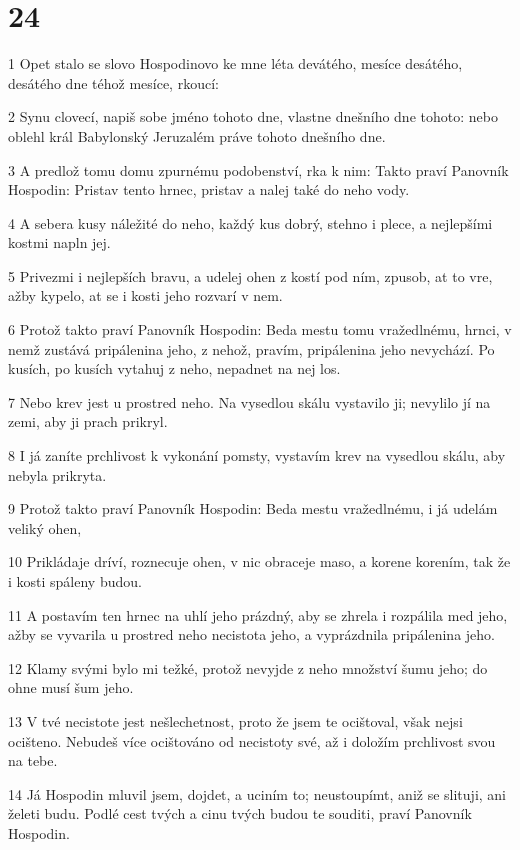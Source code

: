 \chapter{24}

\par 1 Opet stalo se slovo Hospodinovo ke mne léta devátého, mesíce desátého, desátého dne téhož mesíce, rkoucí:
\par 2 Synu clovecí, napiš sobe jméno tohoto dne, vlastne dnešního dne tohoto: nebo oblehl král Babylonský Jeruzalém práve tohoto dnešního dne.
\par 3 A predlož tomu domu zpurnému podobenství, rka k nim: Takto praví Panovník Hospodin: Pristav tento hrnec, pristav a nalej také do neho vody.
\par 4 A sebera kusy náležité do neho, každý kus dobrý, stehno i plece, a nejlepšími kostmi napln jej.
\par 5 Privezmi i nejlepších bravu, a udelej ohen z kostí pod ním, zpusob, at to vre, ažby kypelo, at se i kosti jeho rozvarí v nem.
\par 6 Protož takto praví Panovník Hospodin: Beda mestu tomu vražedlnému, hrnci, v nemž zustává pripálenina jeho, z nehož, pravím, pripálenina jeho nevychází. Po kusích, po kusích vytahuj z neho, nepadnet na nej los.
\par 7 Nebo krev jest u prostred neho. Na vysedlou skálu vystavilo ji; nevylilo jí na zemi, aby ji prach prikryl.
\par 8 I já zaníte prchlivost k vykonání pomsty, vystavím krev na vysedlou skálu, aby nebyla prikryta.
\par 9 Protož takto praví Panovník Hospodin: Beda mestu vražedlnému, i já udelám veliký ohen,
\par 10 Prikládaje dríví, roznecuje ohen, v nic obraceje maso, a korene korením, tak že i kosti spáleny budou.
\par 11 A postavím ten hrnec na uhlí jeho prázdný, aby se zhrela i rozpálila med jeho, ažby se vyvarila u prostred neho necistota jeho, a vyprázdnila pripálenina jeho.
\par 12 Klamy svými bylo mi težké, protož nevyjde z neho množství šumu jeho; do ohne musí šum jeho.
\par 13 V tvé necistote jest nešlechetnost, proto že jsem te ocištoval, však nejsi ocišteno. Nebudeš více ocištováno od necistoty své, až i doložím prchlivost svou na tebe.
\par 14 Já Hospodin mluvil jsem, dojdet, a uciním to; neustoupímt, aniž se slituji, ani želeti budu. Podlé cest tvých a cinu tvých budou te souditi, praví Panovník Hospodin.

